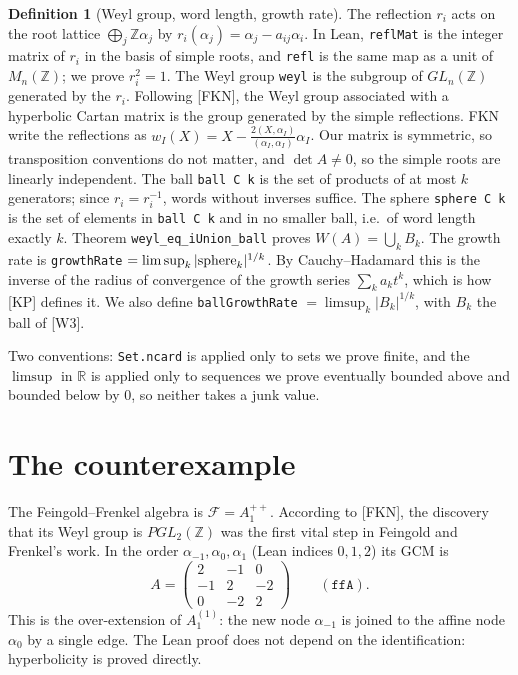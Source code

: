\documentclass[11pt]{article}
\theoremstyle{definition}
\newtheorem{definition}[theorem]{Definition}
\begin{document}
\begin{definition}[Weyl group, word length, growth rate]
The reflection $r_i$ acts on the root lattice $\bigoplus_j \mathbb Z\alpha_j$ by
$r_i(\alpha_j)=\alpha_j-a_{ij}\alpha_i$. In Lean, \texttt{reflMat} is the integer matrix of
$r_i$ in the basis of simple roots, and \texttt{refl} is the same map as a unit of
$M_n(\mathbb Z)$; we prove $r_i^2=1$. The Weyl group \texttt{weyl} is the subgroup of
$GL_n(\mathbb Z)$ generated by the $r_i$. Following [FKN], the Weyl group associated with a
hyperbolic Cartan matrix is the group generated by the simple reflections. FKN write the
reflections as $w_I(X)=X-\frac{2(X,\alpha_I)}{(\alpha_I,\alpha_I)}\alpha_I$. Our matrix is
symmetric, so transposition conventions do not matter, and $\det A\neq 0$, so the simple roots
are linearly independent. The ball \texttt{ball C k} is the set of products of at most $k$
generators; since $r_i=r_i^{-1}$, words without inverses suffice. The sphere \texttt{sphere C k}
is the set of elements in \texttt{ball C k} and in no smaller ball, i.e.\ of word length exactly
$k$. Theorem \texttt{weyl\_eq\_iUnion\_ball} proves $W(A)=\bigcup_k B_k$. The growth rate is
\texttt{growthRate} $=\limsup_k |{\rm sphere}_k|^{1/k}$. By Cauchy--Hadamard this is the
inverse of the radius of convergence of the growth series $\sum_k a_k t^k$, which is how
[KP] defines it. We also define \texttt{ballGrowthRate} $=\limsup_k |B_k|^{1/k}$, with $B_k$
the ball of [W3].
\end{definition}

Two conventions: \texttt{Set.ncard} is applied only to sets we prove finite, and the
$\limsup$ in $\mathbb R$ is applied only to sequences we prove eventually bounded above and
bounded below by $0$, so neither takes a junk value.

\section{The counterexample}

The Feingold--Frenkel algebra is $\mathcal F=A_1^{++}$. According to [FKN], the discovery
that its Weyl group is $PGL_2(\mathbb Z)$ was the first vital step in Feingold and Frenkel's
work. In the order $\alpha_{-1},\alpha_0,\alpha_1$ (Lean indices $0,1,2$) its GCM is
\[
A=\begin{pmatrix}2&-1&0\\-1&2&-2\\0&-2&2\end{pmatrix}\qquad(\texttt{ffA}).
\]
This is the over-extension of $A_1^{(1)}$: the new node $\alpha_{-1}$ is joined to the
affine node $\alpha_0$ by a single edge. The Lean proof does not depend on the identification: hyperbolicity is proved directly.
\end{document}
